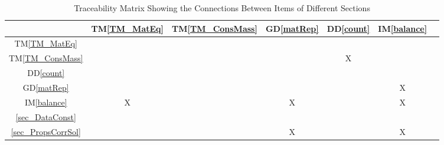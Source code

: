 \documentclass[12pt]{article}
\newcommand{\gdref}[1]{GD\ref{#1}}
\newcommand{\ddref}[1]{DD\ref{#1}}
\newcommand{\tmref}[1]{TM\ref{#1}}
\newcommand{\iref}[1]{IM\ref{#1}}
\begin{document}
\begin{table}[h!]
  \centering
  \begin{tabular}{|c|c|c|c|c|c|c|}
    \hline
                           & \tmref{TM_MatEq} & \tmref{TM_ConsMass} & \gdref{matRep} & \ddref{count} & \iref{balance} \\
    \hline
    \tmref{TM_MatEq}       &                  &                     &                &               &                \\ \hline
    \tmref{TM_ConsMass}    &                  &                     &                & X             &                \\ \hline
    \ddref{count}          &                  &                     &                &               &                \\ \hline
    \gdref{matRep}         &                  &                     &                &               & X              \\ \hline
    \iref{balance}         & X                &                     & X              &               & X              \\ \hline
    \ref{sec_DataConst}    &                  &                     &                &               &                \\ \hline
    \ref{sec_PropsCorrSol} &                  &                     & X              &               & X              \\ \hline
  \end{tabular}
  \caption{Traceability Matrix Showing the Connections Between Items of Different Sections}
  \label{Table:srs_trace}
\end{table}
\end{document}
